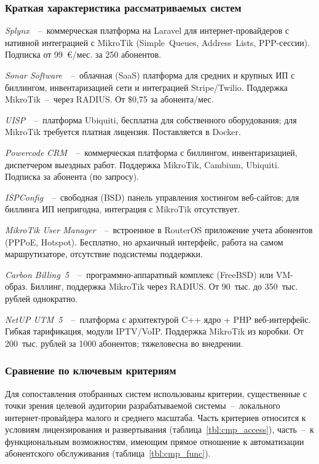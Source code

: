 \subsubsection{Краткая характеристика рассматриваемых систем}

\emph{Splynx}~\cite{splynx}~--~коммерческая платформа на Laravel для интернет-провайдеров с нативной интеграцией с MikroTik (Simple~Queues, Address~Lists, PPP-сессии). Подписка от 99~€/мес. за 250 абонентов.

\emph{Sonar Software}~\cite{sonar}~--~облачная (SaaS) платформа для средних и крупных ИП с биллингом, инвентаризацией сети и интеграцией Stripe/Twilio. Поддержка MikroTik~--~через RADIUS. От \$0,75 за абонента/мес.

\emph{UISP}~\cite{uisp}~--~платформа Ubiquiti, бесплатна для собственного оборудования; для MikroTik требуется платная лицензия. Поставляется в Docker.

\emph{Powercode CRM}~\cite{powercode}~--~коммерческая платформа с биллингом, инвентаризацией, диспетчером выездных работ. Поддержка MikroTik, Cambium, Ubiquiti. Подписка за абонента (по запросу).

\emph{ISPConfig}~\cite{ispconfig}~--~свободная (BSD) панель управления хостингом веб-сайтов; для биллинга ИП непригодна, интеграция с MikroTik отсутствует.

\emph{MikroTik User Manager}~\cite{mikrotikwiki}~--~встроенное в RouterOS приложение учета абонентов (PPPoE, Hotspot). Бесплатно, но архаичный интерфейс, работа на самом маршрутизаторе, отсутствие подсистемы поддержки.

\emph{Carbon Billing~5}~\cite{carbon}~--~программно-аппаратный комплекс (FreeBSD) или VM-образ. Биллинг, поддержка MikroTik через RADIUS. От 90~тыс. до 350~тыс. рублей однократно.

\emph{NetUP UTM~5}~\cite{netup}~--~платформа с архитектурой C++ ядро + PHP веб-интерфейс. Гибкая тарификация, модули IPTV/VoIP. Поддержка MikroTik из коробки. От 200~тыс. рублей за 1000 абонентов; тяжеловесна во внедрении.

\subsubsection{Сравнение по ключевым критериям}

Для сопоставления отобранных систем использованы критерии, существенные с точки зрения целевой аудитории разрабатываемой системы~--~локального интернет-провайдера малого и среднего масштаба. Часть критериев относится к условиям лицензирования и развертывания (таблица~\ref{tbl:cmp_access}), часть~--~к функциональным возможностям, имеющим прямое отношение к автоматизации абонентского обслуживания (таблица~\ref{tbl:cmp_func}).

